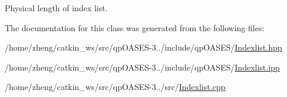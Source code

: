 Physical length of index list. 

The documentation for this class was generated from the following files\+:\begin{DoxyCompactItemize}
\item 
/home/zheng/catkin\+\_\+ws/src/qp\+O\+A\+S\+E\+S-\/3../include/qp\+O\+A\+S\+E\+S/\hyperlink{_indexlist_8hpp}{Indexlist.\+hpp}\item 
/home/zheng/catkin\+\_\+ws/src/qp\+O\+A\+S\+E\+S-\/3../include/qp\+O\+A\+S\+E\+S/\hyperlink{_indexlist_8ipp}{Indexlist.\+ipp}\item 
/home/zheng/catkin\+\_\+ws/src/qp\+O\+A\+S\+E\+S-\/3../src/\hyperlink{_indexlist_8cpp}{Indexlist.\+cpp}\end{DoxyCompactItemize}
